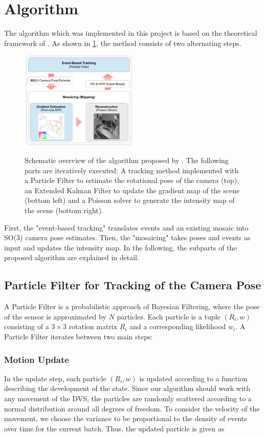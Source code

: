 \documentclass[10pt,twocolumn,letterpaper]{article}
\begin{document}
\section{Algorithm}
The algorithm which was implemented in this project is based on the theoretical framework of \cite{kim2014simultaneous}. As shown in \cref{fig:algorithm}, the method consists of two alternating steps. 

\begin{figure}[h!]
    \centering
    \includegraphics[width=0.5\textwidth]{figures/algo.png}
    \label{fig:algorithm}
    \caption{Schematic overview of the algorithm proposed by \cite{kim2014simultaneous}. The following parts are iteratively executed: A tracking method implemented with a Particle Filter to estimate the rotational pose of the camera (top), an Extended Kalman Filter to update the gradient map of the scene (bottom left) and a Poisson solver to generate the intensity map of the scene (bottom right).}
\end{figure}

First, the "event-based tracking" translates events and an existing mosaic into SO(3) camera pose estimates. Then, the "mosaicing" takes poses and events as input and updates the intensity map. In the following, the subparts of the proposed algorithm are explained in detail. 

\subsection{Particle Filter for Tracking of the Camera Pose}
A Particle Filter is a probabilistic approach of Bayesian Filtering, where the pose of the sensor is approximated by $N$ particles. 
Each particle is a tuple $(R_i, w)$ consisting of a $3\times 3 $ rotation matrix $R_i$ and a corresponding likelihood $w_i$.
A Particle Filter iterates between two main steps:
\subsubsection*{Motion Update}
In the update step, each particle $(R_i, w)$ is updated according to a function describing the development of the state. Since our algorithm should work with any movement of the DVS, the particles are randomly scattered according to a normal distribution around all degrees of freedom. To consider the velocity of the movement, we choose the variance to be proportional to the density of events over time for the current batch. Thus, the updated particle is given as 
\end{document}
